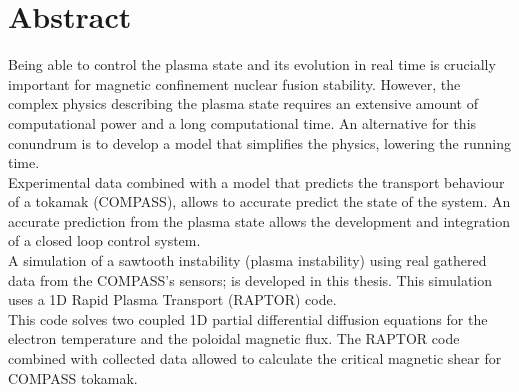  \chapter*{Abstract}
Being able to control the plasma state and its evolution in real time is crucially important for magnetic confinement nuclear fusion stability. However, the complex physics describing the plasma state requires an extensive amount of computational power and a long computational time. An alternative for this conundrum is to develop a model that simplifies the physics, lowering the running time.\\

Experimental data combined with a model that predicts the transport behaviour of a tokamak (COMPASS), allows to accurate predict the state of the system. An accurate prediction from the plasma state allows the development and integration of a closed loop control system. \\

A simulation of a sawtooth instability (plasma instability) using real gathered data from the COMPASS’s sensors; is developed in this thesis. This simulation uses a 1D Rapid Plasma Transport (RAPTOR) code.\\

This code solves two coupled 1D partial differential diffusion equations for the electron temperature and the poloidal magnetic flux. The RAPTOR code combined with collected data allowed to calculate the critical magnetic shear for COMPASS tokamak.


\newpage